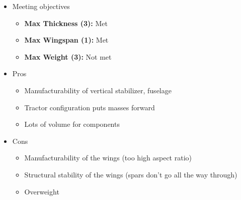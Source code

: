         \begin{itemize}
            \item Meeting objectives
            \begin{itemize}
                \item \textbf{Max Thickness (3):} Met
                \item \textbf{Max Wingspan (1):} Met
                \item \textbf{Max Weight (3):} Not met
            \end{itemize}
            \item Pros
            \begin{itemize}
                \item Manufacturability of vertical stabilizer, fuselage
                \item Tractor configuration puts masses forward
                \item Lots of volume for components
            \end{itemize}
            \item Cons
            \begin{itemize}
                \item Manufacturability of the wings (too high aspect ratio)
                \item Structural stability of the wings (spars don't go all the way through)
                \item Overweight
            \end{itemize}
        \end{itemize}
        
